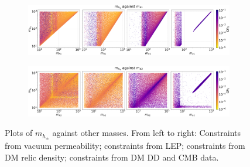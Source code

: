 \documentclass[12pt]{article}
\begin{document}
\begin{figure}[H]
    \begin{subfigure}[b]{\columnwidth}
      \centering
      \includegraphics[width=1\columnwidth]{4plot/MDP_MD1.pdf}
    \end{subfigure}

    \begin{subfigure}[b]{\columnwidth}
      \centering
      \includegraphics[width=1\columnwidth]{4plot/MDP_MD2.pdf}
    \end{subfigure}
    \caption{Plots of $m_{h_\pm}$ against other masses. From left to right: Constraints from vacuum permeability; constraints from LEP; constraints from DM relic density; constraints from DM DD and CMB data.}
\end{figure}
\end{document}
